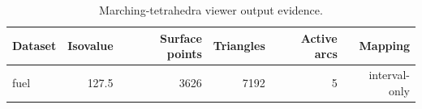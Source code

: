 \begin{table}[htbp]
\centering
\small
\caption{Marching-tetrahedra viewer output evidence.}
\label{tab:marching-tetrahedra-viewer}
\begin{tabular}{lrrrrr}
\hline
Dataset & Isovalue & Surface points & Triangles & Active arcs & Mapping \\
\hline
fuel & 127.5 & 3626 & 7192 & 5 & interval-only \\
\hline
\end{tabular}
\end{table}
